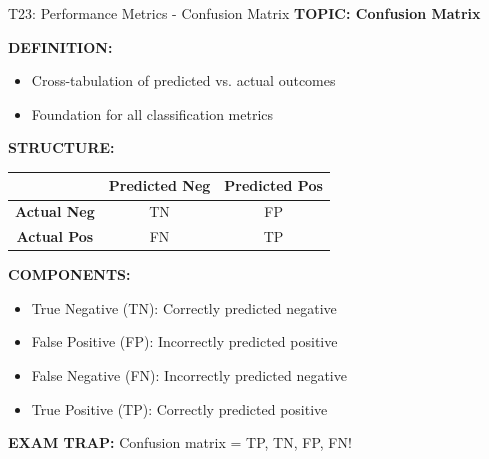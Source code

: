 \documentclass[8pt]{beamer}
\begin{document}
	\begin{frame}{T23: Performance Metrics - Confusion Matrix}
		\fontsize{6.5}{7.5}\selectfont
		\textbf{TOPIC: Confusion Matrix}
		
		\vspace{0.1cm}
		\textbf{DEFINITION:}
		\begin{itemize}
			\item Cross-tabulation of predicted vs. actual outcomes
			\item Foundation for all classification metrics
		\end{itemize}
		
		\vspace{0.1cm}
		\textbf{STRUCTURE:}
		
		\begin{tabular}{|c|c|c|}
			\hline
			& \textbf{Predicted Neg} & \textbf{Predicted Pos} \\
			\hline
			\textbf{Actual Neg} & TN & FP \\
			\hline
			\textbf{Actual Pos} & FN & TP \\
			\hline
		\end{tabular}
		
		\vspace{0.1cm}
		\textbf{COMPONENTS:}
		\begin{itemize}
			\item \textcolor{myblue}{True Negative (TN):} Correctly predicted negative
			\item \textcolor{myblue}{False Positive (FP):} Incorrectly predicted positive
			\item \textcolor{myblue}{False Negative (FN):} Incorrectly predicted negative
			\item \textcolor{myblue}{True Positive (TP):} Correctly predicted positive
		\end{itemize}
		
		\textcolor{myred}{\textbf{EXAM TRAP:}} Confusion matrix = \textcolor{myblue}{TP, TN, FP, FN}!
	\end{frame}
	
	
\end{document}
